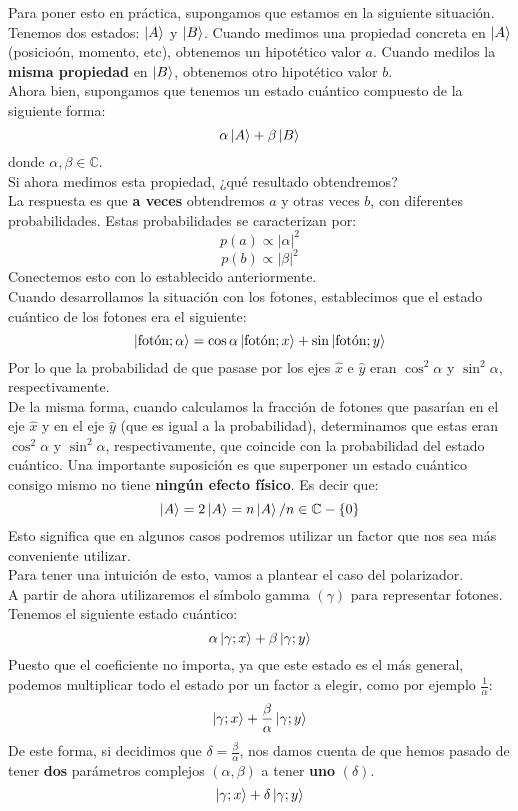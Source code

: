 \documentclass{article}
\begin{document}
Para poner esto en práctica, supongamos que estamos en la siguiente situación. Tenemos dos estados: $\ket{A}$ y $\ket{B}$. Cuando medimos
una propiedad concreta en $\ket{A}$ (posicioón, momento, etc), obtenemos un hipotético valor $a$. Cuando medilos la \textbf{misma propiedad} en
$\ket{B}$, obtenemos otro hipotético valor $b$.\\
Ahora bien, supongamos que tenemos un estado cuántico compuesto de la siguiente forma:
\[
    \alpha\ket{A}+\beta\ket{B}
\]
donde $\alpha,\beta \in \mathbb{C}$.\\
Si ahora medimos esta propiedad, ¿qué resultado obtendremos?\\
La respuesta es que \textbf{a veces} obtendremos $a$ y otras veces $b$, con diferentes probabilidades. Estas probabilidades se caracterizan por:
\[
    p(a)\propto |\alpha|^2
\]
\[
    p(b)\propto |\beta|^2
\]
Conectemos esto con lo establecido anteriormente.\\
Cuando desarrollamos la situación con los fotones, establecimos que el estado cuántico de los fotones era el siguiente:
\[
    \ket{\text{fotón}; \alpha}= \cos \alpha \ket{\text{fotón}; x}+\sin \ket{\text{fotón}; y}
\]
Por lo que la probabilidad de que pasase por los ejes $\hat{x}$ e $\hat{y}$ eran $\cos ^2 \alpha$ y $\sin ^2 \alpha$, respectivamente.\\
De la misma forma, cuando calculamos la fracción de fotones que pasarían en el eje $\hat{x}$ y en el eje $\hat{y}$ (que es igual a la probabilidad), determinamos que estas eran $\cos ^2 \alpha$
y $\sin ^2 \alpha$, respectivamente, que coincide con la probabilidad del estado cuántico.
Una importante suposición es que superponer un estado cuántico consigo mismo no tiene \textbf{ningún efecto físico}. Es decir que:
\[
    \ket{A}=2\ket{A}=n\ket{A} / n \in \mathbb{C}-\{0\}
\]
Esto significa que en algunos casos podremos utilizar un factor que nos sea más conveniente utilizar.\\
Para tener una intuición de esto, vamos a plantear el caso del polarizador.\\
A partir de ahora utilizaremos el símbolo gamma $(\gamma)$ para representar fotones.\\
Tenemos el siguiente estado cuántico:
\[
    \alpha\ket{\gamma; x}+\beta\ket{\gamma;y}
\]
Puesto que el coeficiente no importa, ya que este estado es el más general, podemos multiplicar todo el estado por un factor a elegir, como
por ejemplo $\frac{1}{\alpha}$:
\[
    \ket{\gamma;x}+ \frac{\beta}{\alpha}\ket{\gamma;y}
\] 
De este forma, si decidimos que $\delta= \frac{\beta}{\alpha}$, nos damos cuenta de que hemos pasado de tener \textbf{dos} parámetros
complejos $(\alpha,\beta)$ a tener \textbf{uno} $(\delta)$.
\[
    \ket{\gamma; x}+\delta\ket{\gamma;y}
\]
\end{document}
